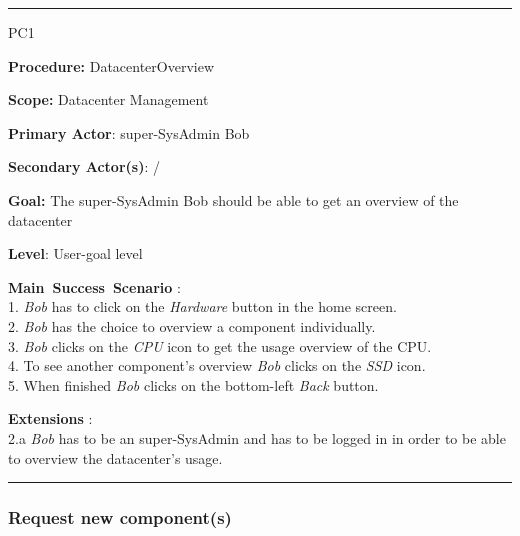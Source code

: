 \hrule
\vspace{0.5cm}
\begin{lyxlist}{PC1}
\small{
\item [\textbf{Procedure:}] DatacenterOverview
\item [\textbf{Scope:}] Datacenter Management
\item [\textbf{Primary Actor}:] super-SysAdmin Bob
\item [\textbf{Secondary Actor(s)}:] /
\item [\textbf{Goal:}] The super-SysAdmin Bob should be able to get an overview
of the datacenter
\item [\textbf{Level}:] User-goal level
\item [\textbf{Main~Success~Scenario}]:\\
1. \emph{Bob} has to click on the \emph{Hardware} button in the home screen.\\
2. \emph{Bob} has the choice to overview a component individually.\\
3. \emph{Bob} clicks on the \emph{CPU} icon to get the usage overview of the
CPU.\\
4. To see another component's overview \emph{Bob} clicks on the \emph{SSD}
icon.\\
5. When finished \emph{Bob} clicks on the bottom-left \emph{Back} button.\\


\item [\textbf{Extensions}]:\\
2.a \emph{Bob} has to be an super-SysAdmin and has to be logged in in order to
be able to overview the datacenter's usage.\\
}
\end{lyxlist}
\hrule


\subsubsection{Request new component(s)}

